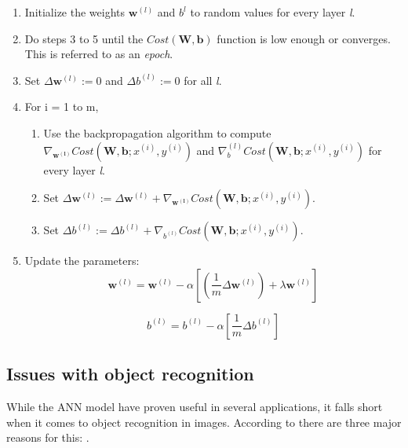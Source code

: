 \begin{enumerate}
	\item Initialize the weights $ \mathbf{w}^{(l)} $ and $ b^{l} $ to random values for every layer \textit{l}.
	\item Do steps 3 to 5 until the $ Cost(\mathbf{W, b}) $ function is low enough or converges. This is referred to as an \textit{epoch}. 
	\item Set $ \Delta\mathbf{w}^{(l)} := 0 $ and $ \Delta b^{(l)} := 0 $ for all \textit{l}.
	\item For i = 1 to m,
		\begin{enumerate}
			\item Use the backpropagation algorithm to compute $ \nabla_\mathbf{w^{(l)}}Cost(\mathbf{W, b};x^{(i)},y^{(i)}) $ and $ \nabla_b^{(l)}Cost(\mathbf{W, b};x^{(i)},y^{(i)}) $ for every layer \textit{l}.
			\item  Set $ \Delta\mathbf{w}^{(l)} := \Delta\mathbf{w}^{(l)} + \nabla_\mathbf{w^{(l)}}Cost(\mathbf{W, b};x^{(i)},y^{(i)}) $. 
			\item  Set $ \Delta b^{(l)} := \Delta b^{(l)} + \nabla_{b^{(l)}}Cost(\mathbf{W, b};x^{(i)},y^{(i)}) $. 
		\end{enumerate}
	\item Update the parameters:
		\begin{equation*}
			\mathbf{w}^{(l)} = \mathbf{w}^{(l)} - \alpha[(\frac{1}{m}\Delta\mathbf{w}^{(l)}) + \lambda\mathbf{w}^{(l)}]
		\end{equation*}
		
		\begin{equation*}
			b^{(l)} = b^{(l)} - \alpha[\frac{1}{m}\Delta b^{(l)}]
		\end{equation*}
\end{enumerate}

\subsection{Issues with object recognition}\label{ann_issues}

While the ANN model have proven useful in several applications, it falls short when it comes to object recognition in images. According to \cite{LeCun1998} there are three major reasons for this: . 

